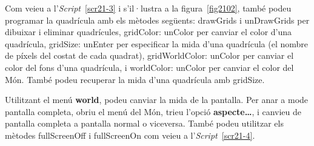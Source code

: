 Com veieu a l'\emph{Script}~\ref{scr21-3} i s'il·lustra a la figura~\ref{fig2102}, també podeu programar la quadrícula amb els mètodes següents: \textsf{drawGrids} i \textsf{unDrawGrids} per dibuixar i eliminar quadrícules, \textsf{gridColor: unColor} per canviar el color d'una quadrícula, \textsf{gridSize: unEnter} per especificar la mida d'una quadrícula (el nombre de píxels del costat de cada quadrat), \textsf{gridWorldColor: unColor} per canviar el color del fons d'una quadrícula, i \textsf{worldColor: unColor} per canviar el color del Món. També podeu recuperar la mida d'una quadrícula amb \textsf{gridSize}. 


Utilitzant el menú \textbf{world}, podeu canviar la mida de la pantalla. Per anar a mode pantalla completa, obriu el menú del Món, trieu l'opció \textbf{aspecte\dots}, i canvieu de pantalla completa a pantalla normal o viceversa. També podeu utilitzar els mètodes \textsf{fullScreenOff} i \textsf{fullScreenOn} com veieu a l'\emph{Script}~\ref{scr21-4}.  

